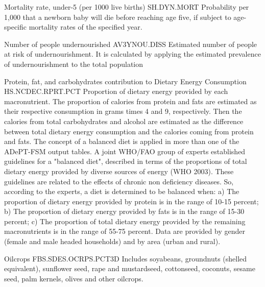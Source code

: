 \begin{MetadataCollection}
\begin{metadata}{ Mortality rate, under-5 (per 1000 live births) }{ SH.DYN.MORT }
Probability per 1,000 that a newborn baby will die before reaching age five, if subject to age-specific mortality rates of the specified year. 
\end{metadata}

\begin{metadata}{ Number of people undernourished }{ AV3YNOU.DISS }
Estimated number of people at risk of undernourishment. It is calculated by applying the estimated prevalence of undernourishment to the total population 
\end{metadata}

\begin{metadata}{ Protein, fat, and carbohydrates contribution to Dietary Energy Consumption }{ HS.NCDEC.RPRT.PCT }
Proportion of dietary energy provided by each macronutrient. The proportion of calories from protein and fats are estimated as their respective consumption in grams times 4 and 9, respectively. Then the calories from total carbohydrates and alcohol are estimated as the difference between total dietary energy consumption and the calories coming from protein and fats. The concept of a balanced diet is applied in more than one of the ADePT-FSM output tables. A joint WHO/FAO group of experts established guidelines for a "balanced diet", described in terms of the proportions of total dietary energy provided by diverse sources of energy (WHO 2003). These guidelines are related to the effects of chronic non deficiency diseases. So, according to the experts, a diet is determined to be balanced when: a) The proportion of dietary energy provided by protein is in the range of 10-15 percent; b) The proportion of dietary energy provided by fats is in the range of 15-30 percent; c) The proportion of total dietary energy provided by the remaining macronutrients is in the range of 55-75 percent. Data are provided by gender (female and male headed households) and by area (urban and rural).
\end{metadata}

\begin{metadata}{ Oilcrops }{ FBS.SDES.OCRPS.PCT3D }
Includes soyabeans, groundnuts (shelled equivalent), sunflower seed, rape and mustardseed, cottonseed, coconuts, sesame seed, palm kernels, olives and other oilcrops. 
\end{metadata}


\end{MetadataCollection}
